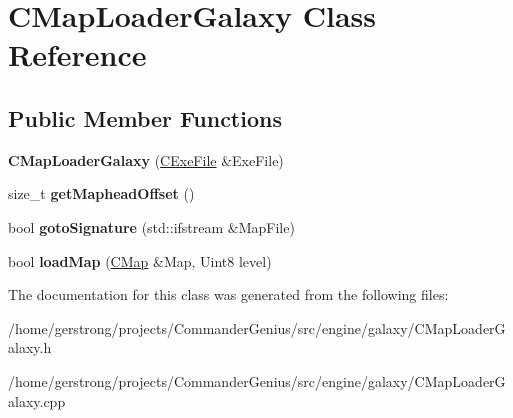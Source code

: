 \hypertarget{class_c_map_loader_galaxy}{
\section{CMapLoaderGalaxy Class Reference}
\label{class_c_map_loader_galaxy}
}
\subsection*{Public Member Functions}
\begin{DoxyCompactItemize}
\item 
\hypertarget{class_c_map_loader_galaxy_a10719e87cfc7eab05dbbf0c42b2e77c4}{
{\bfseries CMapLoaderGalaxy} (\hyperlink{class_c_exe_file}{CExeFile} \&ExeFile)}
\label{class_c_map_loader_galaxy_a10719e87cfc7eab05dbbf0c42b2e77c4}

\item 
\hypertarget{class_c_map_loader_galaxy_abf08da8039ab0aa25db9e83366d3a33a}{
size\_\-t {\bfseries getMapheadOffset} ()}
\label{class_c_map_loader_galaxy_abf08da8039ab0aa25db9e83366d3a33a}

\item 
\hypertarget{class_c_map_loader_galaxy_a0aeaa22bb1ad86f3736a5cc1aa73567d}{
bool {\bfseries gotoSignature} (std::ifstream \&MapFile)}
\label{class_c_map_loader_galaxy_a0aeaa22bb1ad86f3736a5cc1aa73567d}

\item 
\hypertarget{class_c_map_loader_galaxy_a5ce5d87729318540afc5c34b120d7964}{
bool {\bfseries loadMap} (\hyperlink{class_c_map}{CMap} \&Map, Uint8 level)}
\label{class_c_map_loader_galaxy_a5ce5d87729318540afc5c34b120d7964}

\end{DoxyCompactItemize}


The documentation for this class was generated from the following files:\begin{DoxyCompactItemize}
\item 
/home/gerstrong/projects/CommanderGenius/src/engine/galaxy/CMapLoaderGalaxy.h\item 
/home/gerstrong/projects/CommanderGenius/src/engine/galaxy/CMapLoaderGalaxy.cpp\end{DoxyCompactItemize}
